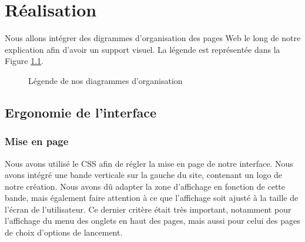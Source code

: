 \chapter{Réalisation}

Nous allons intégrer des digrammes d'organisation des pages Web le long de notre explication afin d'avoir un support visuel. La légende est représentée dans la Figure \ref{DiagLegende}.

\begin{figure}[!ht]
	\begin{center}
		\caption{Légende de nos diagrammes d'organisation}
  		\label{DiagLegende}
  	\end{center}	
\end{figure}

\section{Ergonomie de l'interface}

\subsection{Mise en page}
Nous avons utilisé le CSS afin de régler la mise en page de notre interface. Nous avons intégré une bande verticale sur la gauche du site, contenant un logo de notre création. Nous avons dû adapter la zone d'affichage en fonction de cette bande, mais également faire attention à ce que l'affichage soit ajusté à la taille de l'écran de l'utilisateur. Ce dernier critère était très important, notamment pour l'affichage du menu des onglets en haut des pages, mais aussi pour celui des pages de choix d'options de lancement. 

